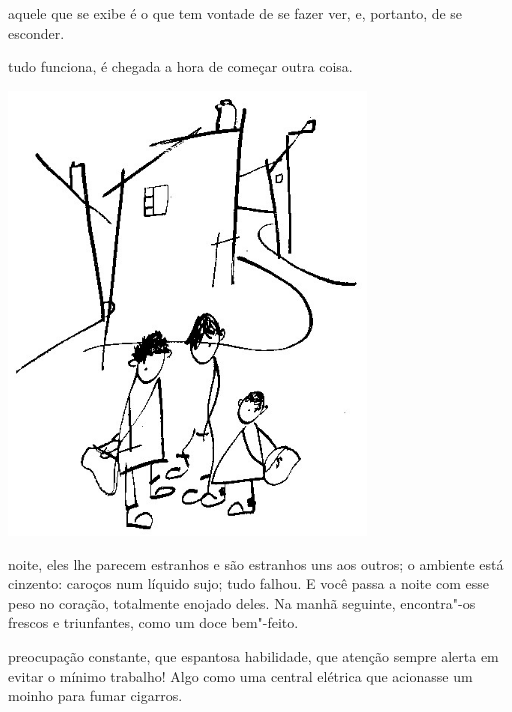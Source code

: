 \bigskip
\bigskip

 aquele que se exibe é o que tem vontade de se fazer ver, e,
portanto, de se esconder.

\bigskip
\bigskip

 tudo funciona, é chegada a hora de começar outra coisa.

\pagebreak
\thispagestyle{empty}

\begin{vplace}[.50]
\begin{center}
\includegraphics[width=95mm]{./imgs/Image_7.jpg}
\end{center}
\end{vplace}

\bigskip
\bigskip

\pagebreak
\thispagestyle{empty}
\movetooddpage

 noite, eles lhe parecem estranhos e são estranhos uns aos outros; o
ambiente está cinzento: caroços num líquido sujo; tudo falhou. E você
passa a noite com esse peso no coração, totalmente enojado deles. Na
manhã seguinte, encontra"-os frescos e triunfantes, como um doce
bem"-feito.

\bigskip
\bigskip

 preocupação constante, que espantosa habilidade, que atenção sempre
alerta em evitar o mínimo trabalho! Algo como uma central elétrica que
acionasse um moinho para fumar cigarros.

